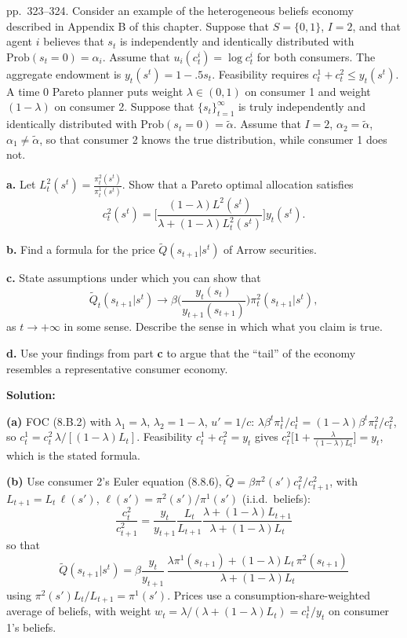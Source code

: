 \documentclass[12pt, letterpaper]{article}
\begin{document}
\begin{tcolorbox}[evenbox,title={Exercise 8.22 \quad Heterogeneous beliefs again}]
\begin{tcolorbox}[questionbox]
pp.~323--324. Consider an example of the heterogeneous beliefs economy described in Appendix B of this
chapter. Suppose that $S=\{0,1\}$, $I=2$, and that agent $i$ believes that $s_t$ is independently and
identically distributed with $\mathrm{Prob}(s_t=0)=\alpha_i$. Assume that $u_i(c^i_t)=\log c^i_t$ for both
consumers. The aggregate endowment is $y_t(s^t)=1-.5s_t$. Feasibility requires $c^1_t+c^2_t\le y_t(s^t)$. A
time 0 Pareto planner puts weight $\lambda\in(0,1)$ on consumer 1 and weight $(1-\lambda)$ on consumer 2.
Suppose that $\{s_t\}_{t=1}^\infty$ is truly independently and identically distributed with
$\mathrm{Prob}(s_t=0)=\tilde\alpha$. Assume that $I=2$, $\alpha_2=\tilde\alpha$, $\alpha_1\ne\tilde\alpha$, so that consumer 2
knows the true distribution, while consumer 1 does not.

\textbf{a.} Let $L^2_t(s^t)=\frac{\pi^2_t(s^t)}{\pi^1_t(s^t)}$. Show that a Pareto optimal allocation satisfies
\[
c^2_t(s^t)=\Big[\frac{(1-\lambda)L^2(s^t)}{\lambda+(1-\lambda)L^2_t(s^t)}\Big]y_t(s^t).
\]

\textbf{b.} Find a formula for the price $\tilde Q(s_{t+1}|s^t)$ of Arrow securities.

\textbf{c.} State assumptions under which you can show that
\[
\tilde Q_t(s_{t+1}|s^t)\to\beta\Big(\frac{y_t(s_t)}{y_{t+1}(s_{t+1})}\Big)\pi^2_t(s_{t+1}|s^t),
\]
as $t\to+\infty$ in some sense. Describe the sense in which what you claim is true.

\textbf{d.} Use your findings from part \textbf{c} to argue that the ``tail'' of the economy resembles a
representative consumer economy.
\end{tcolorbox}

\textbf{Solution:}

\textbf{(a)} FOC (8.B.2) with $\lambda_1=\lambda$, $\lambda_2=1-\lambda$, $u'=1/c$:
$\lambda\beta^t\pi^1_t/c^1_t=(1-\lambda)\beta^t\pi^2_t/c^2_t$, so $c^1_t=c^2_t\,\lambda/[(1-\lambda)L_t]$. Feasibility
$c^1_t+c^2_t=y_t$ gives $c^2_t\big[1+\frac{\lambda}{(1-\lambda)L_t}\big]=y_t$, which is the stated formula.
\checkmark

\textbf{(b)} Use consumer 2's Euler equation (8.8.6), $\tilde Q=\beta\pi^2(s')c^2_t/c^2_{t+1}$, with
$L_{t+1}=L_t\,\ell(s')$, $\ell(s')=\pi^2(s')/\pi^1(s')$ (i.i.d.\ beliefs):
\[
\frac{c^2_t}{c^2_{t+1}}=\frac{y_t}{y_{t+1}}\frac{L_t}{L_{t+1}}\frac{\lambda+(1-\lambda)L_{t+1}}{\lambda+(1-\lambda)L_t}
\]
so that
\[
\boxed{\tilde Q(s_{t+1}|s^t)=\beta\frac{y_t}{y_{t+1}}\,\frac{\lambda\pi^1(s_{t+1})+(1-\lambda)L_t\,\pi^2(s_{t+1})}{\lambda+(1-\lambda)L_t}}
\]
using $\pi^2(s')L_t/L_{t+1}=\pi^1(s')$. Prices use a consumption-share-weighted average of beliefs, with weight
$w_t=\lambda/(\lambda+(1-\lambda)L_t)=c^1_t/y_t$ on consumer 1's beliefs.


\end{tcolorbox}
\end{document}
